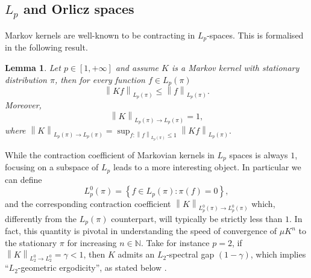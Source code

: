 \documentclass[11pt]{article}
\theoremstyle{plain}
\newtheorem{lemma}[theorem]{Lemma}
\theoremstyle{remark}
\begin{document}
\subsection{$L_p$ and Orlicz spaces} \label{sec:lpAndOrliczSpaces}
Markov kernels are well-known to be contracting in $L_p$-spaces. This is formalised in the following result.
\begin{lemma}
    Let $p\in [1,+\infty]$ and assume $K$ is a Markov kernel with stationary distribution $\pi$, then for every function $f\in L_p(\pi)$
    \begin{equation}
        \left\lVert Kf \right\rVert_{L_p(\pi)} \leq \left\lVert f \right\rVert_{L_p(\pi)}.
    \end{equation}
    Moreover, \begin{equation}
        \left\lVert K \right\rVert_{L_p(\pi)\to L_p(\pi)} = 1,
    \end{equation}
    where $ \left\lVert K \right\rVert_{L_p(\pi)\to L_p(\pi)} = \sup_{f: \left\lVert f\right\rVert_{L_p(\pi)}\leq 1} \left\lVert K f \right\rVert_{L_p(\pi)}.$
\end{lemma} 
While the contraction coefficient of Markovian kernels in $L_p$ spaces is always $1$, focusing on a subspace of $L_p$ leads to a more interesting object. In particular we can define %
\begin{equation}
    L_p^0(\pi) = \left\{f\in L_p(\pi): \pi(f)=0\right\},
\end{equation}
and %
the corresponding contraction coefficient $\left\lVert K\right\rVert_{L_p^0(\pi)\to L_p^0(\pi)} $ which, differently from the $L_p(\pi)$ counterpart, will typically be strictly less than $1$. In fact, this quantity is pivotal in understanding the speed of convergence of $\mu K^n$ to the stationary $\pi$ for increasing $n\in \mathbb{N}$. Take for instance $p=2$,
    if $\left\lVert K \right\rVert_{L_2^0\to L_2^0}=\gamma<1$, then $K$ %
    admits an $L_2$-spectral gap $(1-\gamma)$, which implies 
``$L_2$-geometric ergodicity'', as stated below \cite[Proposition 3.12]{mcmcThesis}.
    
\end{document}
